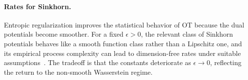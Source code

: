 %
%


\paragraph{Rates for Sinkhorn.}

Entropic regularization improves the statistical behavior of OT because the dual potentials become smoother. For a fixed $\epsilon>0$, the relevant class of Sinkhorn potentials behaves like a smooth function class rather than a Lipschitz one, and its empirical process complexity can lead to dimension-free rates under suitable assumptions~\cite{genevay2018sample}. The tradeoff is that the constants deteriorate as $\epsilon \rightarrow 0$, reflecting the return to the non-smooth Wasserstein regime.
